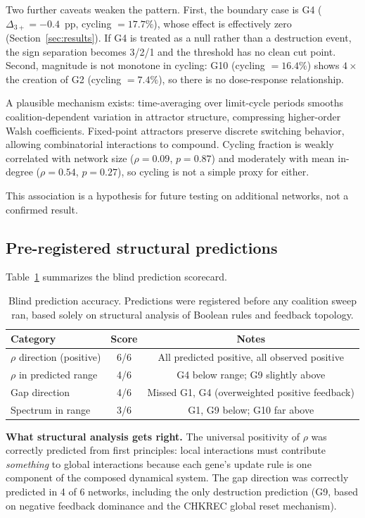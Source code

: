 \documentclass[11pt]{article}
\begin{document}
Two further caveats weaken the pattern. First, the boundary case is
G4 ($\Delta_{3+} = -0.4$~pp, cycling $= 17.7\%$), whose effect
is effectively zero (Section~\ref{sec:results}). If G4 is treated as
a null rather than a destruction event, the sign separation becomes
3/2/1 and the threshold has no clean cut point. Second, magnitude is
not monotone in cycling: G10 (cycling $= 16.4\%$) shows $4\times$ the
creation of G2 (cycling $= 7.4\%$), so there is no dose-response
relationship.

A plausible mechanism exists: time-averaging over limit-cycle periods
smooths coalition-dependent variation in attractor structure,
compressing higher-order Walsh coefficients. Fixed-point attractors
preserve discrete switching behavior, allowing combinatorial
interactions to compound. Cycling fraction is weakly correlated with
network size ($\rho = 0.09$, $p = 0.87$) and moderately with mean
in-degree ($\rho = 0.54$, $p = 0.27$), so cycling is not a simple
proxy for either.

This association is a hypothesis for future testing on additional
networks, not a confirmed result.


\subsection{Pre-registered structural predictions}
\label{sec:blind-results}

Table~\ref{tab:blind} summarizes the blind prediction scorecard.

\begin{table}[t]
\centering
\caption{Blind prediction accuracy. Predictions were registered
before any coalition sweep ran, based solely on structural analysis
of Boolean rules and feedback topology.}
\label{tab:blind}
\begin{tabular}{lcc}
\toprule
Category & Score & Notes \\
\midrule
$\rho$ direction (positive) & 6/6 & All predicted positive, all observed positive \\
$\rho$ in predicted range & 4/6 & G4 below range; G9 slightly above \\
Gap direction & 4/6 & Missed G1, G4 (overweighted positive feedback) \\
Spectrum in range & 3/6 & G1, G9 below; G10 far above \\
\bottomrule
\end{tabular}
\end{table}

\textbf{What structural analysis gets right.}
The universal positivity of $\rho$ was correctly predicted from first
principles: local interactions must contribute \emph{something} to
global interactions because each gene's update rule is one component
of the composed dynamical system. The gap direction was correctly
predicted in 4 of 6 networks, including the only destruction
prediction (G9, based on negative feedback dominance and the CHKREC
global reset mechanism).
\end{document}
